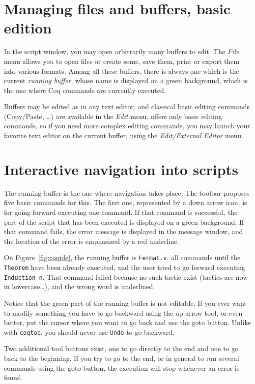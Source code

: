 \section{Managing files and buffers, basic edition}

In the script window, you may open arbitrarily many buffers to
edit. The \emph{File} menu allows you to open files or create some,
save them, print or export them into various formats. Among all these
buffers, there is always one which is the current \emph{running
  buffer}, whose name is displayed on a green background, which is the
one where Coq commands are currently executed. 

Buffers may be edited as in any text editor, and classical basic
editing commands (Copy/Paste, \ldots) are available in the \emph{Edit}
menu. \CoqIDE{} offers only basic editing commands, so if you need
more complex editing commands, you may launch your favorite text
editor on the current buffer, using the \emph{Edit/External Editor}
menu. 

\section{Interactive navigation into \Coq{} scripts}

The running buffer is the one where navigation takes place. The
toolbar proposes five basic commands for this. The first one,
represented by a down arrow icon, is for going forward executing one
command. If that command is successful, the part of the script that
has been executed is displayed on a green background. If that command
fails, the error message is displayed in the message window, and the
location of the error is emphasized by a red underline.

On Figure~\ref{fig:coqide}, the running buffer is \verb|Fermat.v|, all
commands until the \verb|Theorem| have been already executed, and the
user tried to go forward executing \verb|Induction n|. That command
failed because no such tactic exist (tactics are now in
lowercase\ldots), and the wrong word is underlined. 

Notice that the green part of the running buffer is not editable. If
you ever want to modify something you have to go backward using the up
arrow tool, or even better, put the cursor where you want to go back
and use the \textsf{goto} button. Unlike with \verb|coqtop|, you
should never use \verb|Undo| to go backward.

Two additional tool buttons exist, one to go directly to the end and
one to go back to the beginning. If you try to go to the end, or in
general to run several commands using the \textsf{goto} button, the
  execution will stop whenever an error is found.

